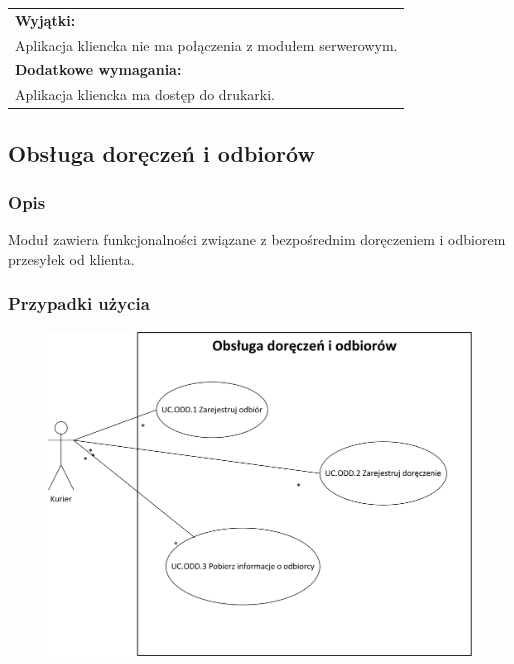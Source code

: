 \begin{center}
\begin{longtable}[h]{|p{1.6cm}|p{13.5cm}|}
{} \\ \hline
\multicolumn{2}{|p{15.1cm}|}{\textbf{Wyjątki:}} \\
\multicolumn{2}{|p{15.1cm}|}{
Aplikacja kliencka nie ma połączenia z modułem serwerowym.
} \\ \hline
\multicolumn{2}{|p{15.1cm}|}{\textbf{Dodatkowe wymagania:}} \\
\multicolumn{2}{|p{15.1cm}|}{
Aplikacja kliencka ma dostęp do drukarki.
} \\
\hline
\end{longtable}
\end{center}

\subsection{Obsługa doręczeń i odbiorów}
\subsubsection*{Opis}
Moduł zawiera funkcjonalności związane z bezpośrednim doręczeniem i odbiorem przesyłek od klienta.

\subsubsection*{Przypadki użycia}
\begin{figure}[H]
\centering
\includegraphics[width=\textwidth]{img/obs_dor_odb_uc}
\end{figure}

